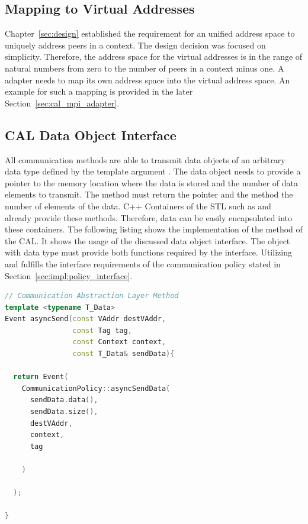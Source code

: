 \subsection{Mapping to Virtual Addresses}
\label{sec:impl:vaddr}
Chapter~\ref{sec:design} established the requirement for an unified address
space to uniquely address peers in a context. The design decision was
focused on simplicity. Therefore, the address space for the
virtual addresses is in the range of natural numbers from zero to the
number of peers in a context minus one. A adapter needs to map its
own address space into the virtual address space. An example for such a
mapping is provided in the later Section~\ref{sec:cal_mpi_adapter}.


\subsection{CAL Data Object Interface}
All communication methods are able to transmit data objects of an
arbitrary data type defined by the template argument . The
data object needs to provide a pointer to the memory location where
the data is stored and the number of data elements to transmit.  The
method  must return the pointer and the method
 the number of elements of the data. C++ Containers of the
STL such as  and ~\cite{ref:vector,
  ref:array} already provide these methods. Therefore, data can be
easily encapsulated into these
containers. The following listing shows the implementation
of the  method of the CAL. It shows the usage of the
discussed data object interface.  The object  with data
type  must provide both functions required by the
interface. Utilizing  and 
fulfills the interface requirements of the communication policy
stated in Section~\ref{sec:impl:policy_interface}.

\begin{lstlisting}[language=C++, breaklines=false, label={lst:cal_async_send}]
// Communication Abstraction Layer Method
template <typename T_Data>
Event asyncSend(const VAddr destVAddr, 
                const Tag tag, 
                const Context context, 
                const T_Data& sendData){

  return Event(
    CommunicationPolicy::asyncSendData(
      sendData.data(),
      sendData.size(), 
      destVAddr, 
      context, 
      tag
      
    )
      
  );

}
\end{lstlisting}

